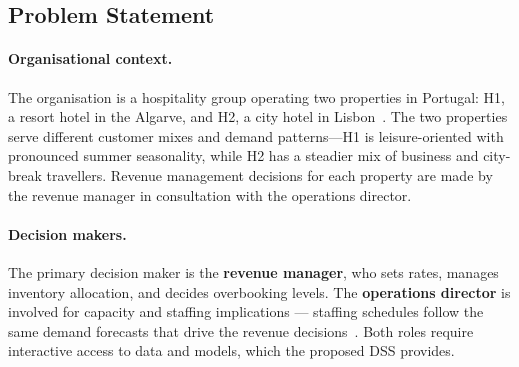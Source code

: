 \subsection{Problem Statement}

\paragraph{Organisational context.}
The organisation is a hospitality group operating two properties in Portugal: H1, a resort hotel in the Algarve, and H2, a city hotel in Lisbon~\cite{antonio2019}. The two properties serve different customer mixes and demand patterns---H1 is leisure-oriented with pronounced summer seasonality, while H2 has a steadier mix of business and city-break travellers. Revenue management decisions for each property are made by the revenue manager in consultation with the operations director.

\paragraph{Decision makers.}
The primary decision maker is the \textbf{revenue manager}, who sets rates, manages inventory allocation, and decides overbooking levels. The \textbf{operations director} is involved for capacity and staffing implications --- staffing schedules follow the same demand forecasts that drive the revenue decisions~\cite{jawabreh2026}. Both roles require interactive access to data and models, which the proposed DSS provides.

